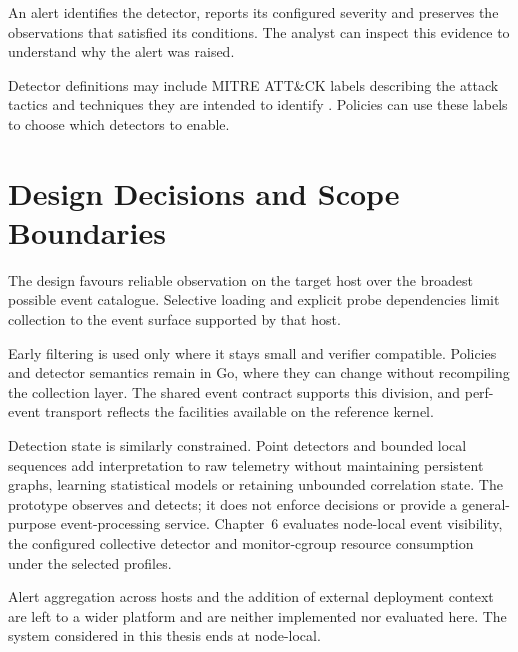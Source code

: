   An alert identifies the detector, reports its configured severity and
  preserves the observations that satisfied its conditions. 
  The analyst can inspect this evidence to understand why the alert was raised.

  Detector definitions may include MITRE ATT\&CK labels describing the attack
  tactics and techniques they are intended to identify \cite{strom2020attack}.
  Policies can use these labels to choose which detectors to enable.

\section{Design Decisions and Scope Boundaries}
\label{sec:design-decisions-boundaries}

The design favours reliable observation on the target host over the broadest
possible event catalogue. Selective loading and explicit probe dependencies
limit collection to the event surface supported by that host.

Early filtering is used only where it stays small and verifier compatible.
Policies and detector semantics remain in Go, where they can change without
recompiling the collection layer. The shared event contract supports this
division, and perf-event transport reflects the facilities available on the
reference kernel.

Detection state is similarly constrained. Point detectors and bounded local
sequences add interpretation to raw telemetry without maintaining persistent
graphs, learning statistical models or retaining unbounded correlation state.
The prototype observes and detects; it does not enforce decisions or provide a
general-purpose event-processing service. Chapter~6 evaluates node-local event
visibility, the configured collective detector and monitor-cgroup resource
consumption under the selected profiles.

Alert aggregation across hosts and the addition of external deployment context
are left to a wider platform and are neither implemented nor evaluated here.
The system considered in this thesis ends at node-local.
